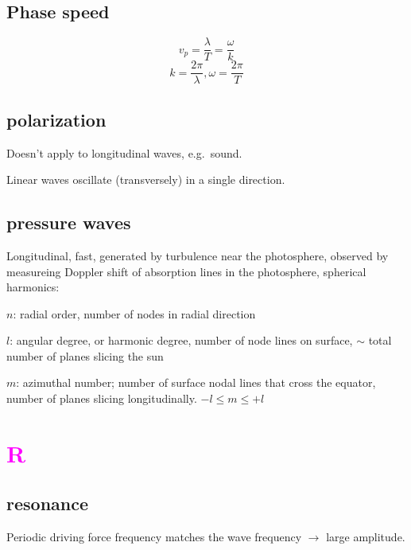 \documentclass[12pt]{article}
\begin{document}
\subsection*{Phase speed}
$$ v_p = \frac{\lambda}{T} = \frac{\omega}{k} $$
$$ k = \frac{2\pi}{\lambda}, \omega = \frac{2\pi}{T} $$

\subsection*{polarization}
\begin{itemize*}
    \item Doesn't apply to longitudinal waves, e.g.\ sound.
    \item Linear waves oscillate (transversely) in a single direction.
\end{itemize*}

\subsection*{pressure waves}
Longitudinal, fast, generated by turbulence near the photosphere,
observed by measureing Doppler shift of absorption lines in the
photosphere, spherical harmonics:
\begin{itemize*}
    \item $n$: radial order, number of nodes in radial direction
    \item $l$: angular degree, or harmonic degree,
        number of node lines on surface,
        $\sim$ total number of planes slicing the sun
    \item $m$: azimuthal number;
        number of surface nodal lines that cross the equator,
        number of planes slicing longitudinally. $-l\leq m\leq +l$
\end{itemize*}

\section*{\textcolor{magenta}{R}}

\subsection*{resonance}
Periodic driving force frequency matches the wave frequency
$\rightarrow$ large amplitude.
\end{document}
